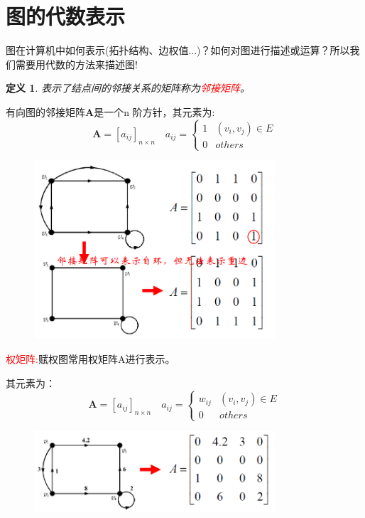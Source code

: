 \documentclass[11pt,a4paper,openany]{book}
\newtheorem{defination}{\textbf{定义}}[section]
\begin{document}
\section{图的代数表示}
图在计算机中如何表示(拓扑结构、边权值...)？如何对图进行描述或运算？所以我们需要用代数的方法来描述图!\\
\begin{defination}
表示了结点间的邻接关系的矩阵称为\textcolor{red}{邻接矩阵}。\\
\end{defination}
\begin{shaded}
\noindent 有向图的邻接矩阵$\mathbf{A}$是一个n 阶方针，其元素为:
$$\mathbf{A}=[a_{ij}]_{n\times n} \quad a_{ij}=\begin{cases}
        1& (v_i,v_j)\in E\\
        0& others
    \end{cases}$$
\end{shaded}
\begin{figure}[H]
  \centering
  \includegraphics[width=0.8\textwidth]{1.9.png}\\
  \caption{}
\end{figure}
\textcolor{red}{权矩阵:}赋权图常用权矩阵A进行表示。
\begin{shaded}
其元素为：
$$\mathbf{A}=[a_{ij}]_{n\times n} \quad a_{ij}=\begin{cases}
        w_{ij}& (v_i,v_j)\in E\\
        0& others
    \end{cases}$$
\end{shaded}
\begin{figure}[H]
  \centering
  \includegraphics[width=0.8\textwidth]{1.10.png}\\
  \caption{}
\end{figure}
\end{document}
